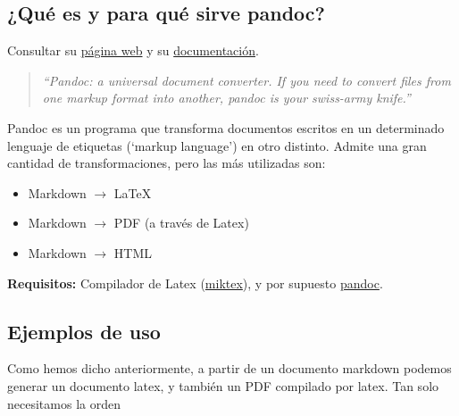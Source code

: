 \documentclass[
]{article}
\providecommand{\tightlist}{%
  \setlength{\itemsep}{0pt}\setlength{\parskip}{0pt}}
\begin{document}
\subsection{¿Qué es y para qué sirve
pandoc?}\label{quuxe9-es-y-para-quuxe9-sirve-pandoc}

Consultar su \href{https://www.pandoc.org/}{página web} y su
\href{https://pandoc.org/MANUAL.html}{documentación}.

\begin{quote}
\emph{``Pandoc: a universal document converter. If you need to convert
files from one markup format into another, pandoc is your swiss-army
knife.''}
\end{quote}

Pandoc es un programa que transforma documentos escritos en un
determinado lenguaje de etiquetas (`markup language') en otro distinto.
Admite una gran cantidad de transformaciones, pero las más utilizadas
son:

\begin{itemize}
\tightlist
\item
  Markdown \(\rightarrow\) \LaTeX
\item
  Markdown \(\rightarrow\) PDF (a través de Latex)
\item
  Markdown \(\rightarrow\) HTML
\end{itemize}

\textbf{Requisitos:} Compilador de Latex
(\href{https://miktex.org/}{miktex}), y por supuesto
\href{https://pandoc.org/installing.html}{pandoc}.

\subsection{Ejemplos de uso}\label{ejemplos-de-uso}

Como hemos dicho anteriormente, a partir de un documento markdown
podemos generar un documento latex, y también un PDF compilado por
latex. Tan solo necesitamos la orden
\end{document}
